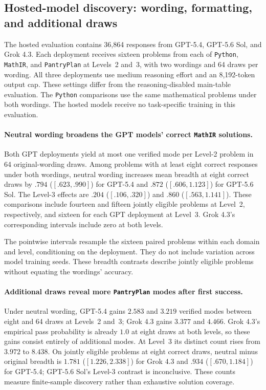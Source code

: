 \subsection{Hosted-model discovery: wording, formatting, and additional draws}
\label{app:hosted-discovery-complete}

The hosted evaluation contains 36,864 responses from GPT-5.4, GPT-5.6 Sol,
and Grok 4.3. Each deployment receives sixteen problems from each of
\texttt{Python}, \texttt{MathIR}, and \texttt{PantryPlan} at Levels~2 and~3,
with two wordings and 64 draws per wording. All three deployments use
medium reasoning effort and an 8,192-token output cap. These settings
differ from the reasoning-disabled main-table evaluation. The \texttt{Python}
comparisons use the same mathematical problems under both wordings.
The hosted models receive no task-specific training in this evaluation.

\paragraph{Neutral wording broadens the GPT models' correct \texttt{MathIR} solutions.}
Both GPT deployments yield at most one verified mode per Level-2 problem
in 64 original-wording draws. Among problems with
at least eight correct responses under both wordings, neutral wording
increases mean breadth at eight correct draws by $.794$ ($[.623,.990]$)
for GPT-5.4 and $.872$ ($[.606,1.123]$) for GPT-5.6 Sol.
The Level-3 effects are $.204$ ($[.106,.320]$) and $.860$
($[.563,1.141]$). These comparisons include fourteen and fifteen jointly
eligible problems at Level~2, respectively, and sixteen for each GPT
deployment at Level~3. Grok 4.3's corresponding intervals include zero at
both levels.

The pointwise intervals resample the sixteen paired problems
within each domain and level, conditioning on the deployment. They do not
include variation across model training seeds. These breadth contrasts
describe jointly eligible problems without equating the wordings' accuracy.

\paragraph{Additional draws reveal more \texttt{PantryPlan} modes after first success.}
Under neutral wording, GPT-5.4 gains $2.583$ and $3.219$ verified modes
between eight and 64 draws at Levels~2 and~3; Grok 4.3 gains $3.377$ and
$4.466$. Grok 4.3's empirical pass probability is already $1.0$ at eight draws
at both levels, so these gains consist entirely of additional modes.
At Level~3 its distinct count rises from $3.972$ to $8.438$.
On jointly eligible problems at eight correct draws, neutral minus
original breadth is $1.781$ ($[1.226,2.338]$) for Grok 4.3 and $.934$
($[.670,1.184]$) for GPT-5.4; GPT-5.6 Sol's Level-3 contrast is
inconclusive. These counts measure finite-sample discovery rather than
exhaustive solution coverage.

